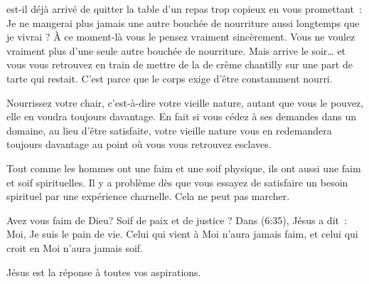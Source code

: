 
 est-il déjà arrivé de quitter la table d'un repas
 trop copieux en vous promettant~:
 \og Je ne mangerai plus jamais une autre bouchée de nourriture aussi longtemps
 que je vivrai \fg{} ?
 \`A ce moment-là vous le pensez vraiment sincèrement.
 Vous ne voulez vraiment plus d'une seule autre bouchée de nourriture.
 Mais arrive le soir\dots{} et vous vous retrouvez en train de mettre
 de la de crème chantilly sur une part de tarte qui restait.
 C'est parce que le corps exige d'être constamment nourri.


Nourrissez votre chair, c'est-à-dire votre vieille nature,
 autant que vous le pouvez, elle en voudra toujours davantage.
 En fait si vous cédez à ses demandes dans un domaine,
 au lieu d'être satisfaite, votre vieille nature vous en redemandera
 toujours davantage au point où vous vous retrouvez esclaves.

Tout comme les hommes ont une faim et une soif physique,
 ils ont aussi une faim et soif spirituelles.
 Il y a problème dès que vous essayez de satisfaire un besoin spirituel
 par une expérience charnelle. Cela ne peut pas marcher.

Avez vous faim de Dieu? Soif de paix et de justice ?
 Dans (6:35), Jésus a dit~:
 \og Moi, Je suis le pain de vie. Celui qui vient à Moi n'aura jamais faim,
 et celui qui croit en Moi n'aura jamais soif. \fg{}

Jésus est la réponse à toutes vos aspirations. 

\dvrule







